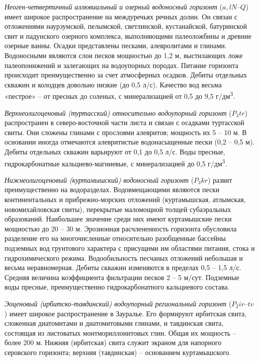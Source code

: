 \documentclass[a4paper,12pt]{article} %
\begin{document}
\textit{Неоген-четвертичный аллювиальный и озерный водоносный горизонт} ($a, lN–Q$) имеет широкое распространение на междуречьях речных долин.
Он связан с отложениями наурзумской, пелымской, светлинской, кустанайской, батуринской свит и падунского озерного комплекса, выполняющими палеоложбины и древние озерные ванны. Осадки представлены песками, алевролитами и глинами. Водоносными являются слои песков мощностью до 1,2 м, выстилающих ложе палеопонижений и залегающих на водоупорных породах. Питание горизонта происходит преимущественно за счет атмосферных осадков. Дебиты отдельных скважин и колодцев довольно низкие (до 0,5 л/с). Качество вод весьма «пестрое» – от пресных до соленых, с минерализацией от 0,5 до 9,5 г/дм\textsuperscript{3}.

\textit{Верхнеолигоценовый (туртасский) относительно водоупорный горизонт} ($P_3tr$) распространен в северо-восточной части листа и связан с осадками туртасской свиты. Они сложены глинами с прослоями алевритов; мощность их 5 – 10 м. В основании иногда отмечаются алевритистые водонасыщенные пески (0,2 – 0,5 м). Дебиты отдельных скважин варьируют от 0,1 до 0,5 л/с. Воды пресные, гидрокарбонатные кальциево-магниевые, с минерализацией до 0,5 г/дм\textsuperscript{3}.

\textit{Нижнеолигоценовый (куртамышский) водоносный горизонт} ($P_3kr$) развит преимущественно на водоразделах. 
Водовмещающими являются пески континентальных и прибрежно-морских отложений (куртамышская, атлымская, новомихайловская свиты), перекрытые маломощной толщей субаэральных образований. 
Наибольшее значение среди них имеют куртамышские пески мощностью до 20 – 30 м. 
Эрозионная расчлененность горизонта обусловила разделение его на многочисленные относительно разобщенные
бассейны подземных вод грунтового характера с присущими им областями питания, стока и гидрохимического режима. Водообильность песчаных отложений небольшая и весьма неравномерная. Дебиты скважин изменяются в пределах 0,5 – 1,5 л/с. Средняя величина коэффициента фильтрации песков 2 – 5 м/сут. Подземные воды пресные, преимущественно гидрокарбонатного кальциевого состава.

\textit{Эоценовый (ирбитско-тавдинский) водоупорный региональный горизонт} ($P_2ir–tv$) 
имеет широкое распространение в Зауралье. Его формируют ирбитская свита, сложенная диатомитами и диатомитовыми глинами, и тавдинская свита, состоящая из листоватых монтмориллонитовых глин. Общая их мощность – более 200 м. 
Нижняя (ирбитская) свита служит экраном для напорного серовского горизонта; верхняя (тавдинская) –
основанием куртамышского.
\end{document}
